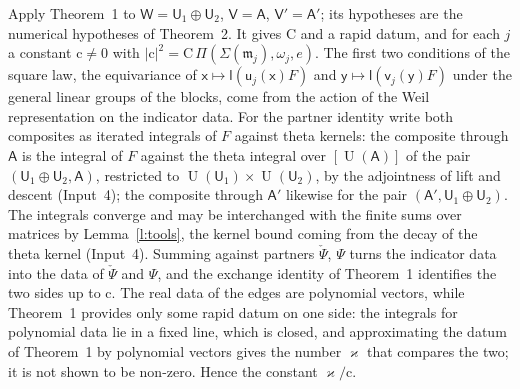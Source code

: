 \documentclass[11pt,a4paper]{article}
\makeatletter
\theoremstyle{plainx}
\theoremstyle{uprightx}
\renewenvironment{proof}[1][Proof]{\par\pushQED{\qed}\normalfont\topsep0pt\partopsep0pt
  \trivlist\item[\hskip\labelsep\itshape #1.]\ignorespaces}{\popQED\endtrivlist\@endpefalse}
\newcommand{\dL}{\check{\Psi}}         %
\newcommand{\dS}{\Psi}
\newcommand{\sW}{\mathsf{W}}
\newcommand{\sV}{\mathsf{V}}
\newcommand{\sU}{\mathsf{U}}
\newcommand{\sA}{\mathsf{A}}
\newcommand{\sx}{\mathsf{x}}
\newcommand{\sy}{\mathsf{y}}
\newcommand{\fm}{\mathfrak{m}}
\newcommand{\rc}{\mathrm{c}}
\newcommand{\rC}{\mathrm{C}}
\newcommand{\U}{\operatorname{U}}
\newcommand{\LPP}[3]{\Pi(#1,#2,#3)}
\makeatother
\begin{document}
\begin{proof}[Proof of Theorem 2]
Apply Theorem~1 to $\sW=\sU_1\oplus\sU_2$, $\sV=\sA$, $\sV'=\sA'$; its hypotheses are the numerical hypotheses of
Theorem~2. It gives $\rC$ and a rapid datum, and for each $j$ a constant $\rc\ne0$ with
$|\rc|^2=\rC\,\LPP{\Sigma(\fm_{j})}{\omega_{j}}{e}$. The first two conditions of the square law, the equivariance of
$\sx\mapsto\mathsf{l}(\mathsf{u}_{j}(\sx)F)$ and $\sy\mapsto\mathsf{l}(\mathsf{v}_{j}(\sy)F)$ under the general linear groups of the blocks, come
from the action of the Weil representation on the indicator data. For the partner identity write both
composites as iterated integrals of $F$ against theta kernels: the composite through $\sA$ is the integral of $F$
against the theta integral over $[\U(\sA)]$ of the pair $(\sU_1\oplus\sU_2,\sA)$, restricted to
$\U(\sU_1)\times\U(\sU_2)$, by the adjointness of lift and descent (Input~4); the composite through $\sA'$
likewise for the pair $(\sA',\sU_1\oplus\sU_2)$. The integrals converge and may be interchanged with the finite
sums over matrices by Lemma~\ref{l:tools}, the kernel bound coming from the decay of the theta kernel (Input~4).
Summing against partners $\dL$, $\dS$ turns the indicator data into the data of $\dL$ and $\dS$, and the exchange
identity of Theorem~1 identifies the two sides up to $\rc$. The real data of the edges are polynomial vectors,
while Theorem~1 provides only some rapid datum on one side: the integrals for polynomial data lie in a fixed
line, which is closed, and approximating the datum of Theorem~1 by polynomial vectors gives the number
$\varkappa$ that compares the two; it is not shown to be non-zero. Hence the constant $\varkappa/\rc$.
\end{proof}
\end{document}
